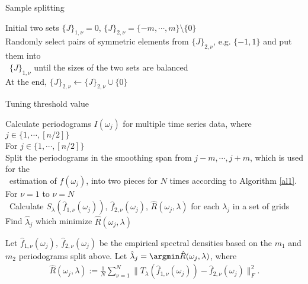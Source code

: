 

\iffalse
\begin{algorithm}
\caption{Sample splitting} \label{al1}
\begin{tabbing}
   \enspace Initial two sets $\{J\}_{1, \nu} = 0$, $\{J\}_{2, \nu} = \{-m, \cdots,  m\}\setminus \{0\}$\\
   \enspace Randomly select pairs of symmetric elements from $\{J\}_{2, \nu}$, e.g. $\{-1, 1\}$ and put them into \\\
   $\{J\}_{1, \nu}$ until the sizes of the two sets are balanced\\
   \enspace At the end, $\{J\}_{2, \nu} \leftarrow \{J\}_{2, \nu}\cup \{0\}$
\enspace 
\end{tabbing}
\end{algorithm}

\begin{algorithm}
\caption{Tuning threshold value} \label{al2}
\begin{tabbing}
   \enspace Calculate periodograms $I(\omega_j)$ for multiple time series data, where $j \in \{1, \cdots, [n/2]\}$\\
   \enspace For $j \in \{1, \cdots, [n/2]\}$ \\
   \qquad Split the periodograms in the smoothing span from $j-m, \cdots, j+m$, which is used for the \\\
   estimation of $f(\omega_j)$, into two pieces for $N$ times according to Algorithm \ref{al1}.\\
   \qquad For $\nu = 1$ to $\nu = N$ \\\
   \qquad\qquad Calculate $S_{\lambda}(\hat{f}_{1,\nu}(\omega_j))$, $\hat{f}_{2,\nu}(\omega_j)$, $\hat{R}(\omega_j,\lambda)$ for each $\lambda_j$ in a set of grids \\
   \qquad Find $\hat{\lambda}_j$ which minimize $\hat{R}(\omega_j,\lambda)$
\enspace 
\end{tabbing}
\end{algorithm}


Let $\hat{f}_{1,\nu}(\omega_j), ~ \hat{f}_{2,\nu}(\omega_j)$ be the empirical spectral densities based on the $m_1$ and $m_2$ periodograms split above. Let $\hat{\lambda}_j = \argmin \hat{R}(\omega_j,\lambda)$, where
\begin{align*}
\hat{R}(\omega_j,\lambda) := \frac 1 N \sum_{\nu = 1}^N \|T_{\lambda}(\hat{f}_{1,\nu}(\omega_j)) - \hat{f}_{2,\nu}(\omega_j)\|_F^2.
\end{align*}


